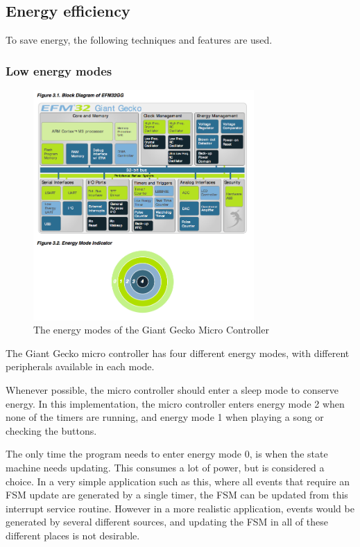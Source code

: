 \subsection{Energy efficiency}

To save energy, the following techniques and features are used.

\subsubsection{Low energy modes}

\begin{figure}[H]
\centering
\includegraphics[width=0.75\textwidth]{figures/energymodes.png}
\caption{The energy modes of the Giant Gecko Micro Controller}
\label{fig:energymodes}
\end{figure}

The Giant Gecko micro controller has four different energy modes, with different peripherals available in each mode.

Whenever possible, the micro controller should enter a sleep mode to conserve energy.
In this implementation, the micro controller enters energy mode 2 when none of the timers are running, and energy mode 1 when playing a song or checking the buttons.

The only time the program needs to enter energy mode 0, is when the state machine needs updating.
This consumes a lot of power, but is considered a choice.
In a very simple application such as this, where all events that require an FSM update are generated by a single timer, the FSM can be updated from this interrupt service routine.
However in a more realistic application, events would be generated by several different sources, and updating the FSM in all of these different places is not desirable.

